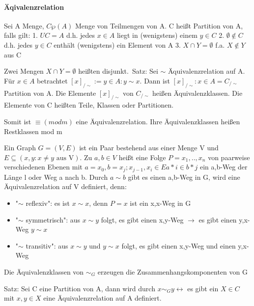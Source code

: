 \documentclass[10pt,landscape]{article}
\begin{document}
\begin{multicols}{3}
\paragraph{Äqivalenzrelation}
Sei A Menge, $C\wp (A)$ Menge von Teilmengen von A. C heißt Partition von A, falls gilt:
1. $UC=A$ d.h. jedes $x\in A$ liegt in (wenigstens) einem $y\in C$
2. $\emptyset \not \in C$ d.h. jedes $y\in C$ enthält (wenigstens) ein Element von A
3. $X \cap Y = \emptyset$ f.a. $X\not \in Y$ aus C

Zwei Mengen $X\cap Y = \emptyset$ heißten disjunkt.\
Satz: Sei $\sim$ Äquivalenzrelation auf A. Für $x\in A$ betrachtet $[x]_{/ \sim }:={y\in A: y \sim x}$. Dann ist ${[x]_{/ \sim }:x\in A}= C_{/ \sim }$ Partition von A. Die Elemente $[x]_{/ \sim }$ von $C_{/ \sim }$ heißen Äquivalenzklassen. Die Elemente von C heißten Teile, Klassen oder Partitionen.

Somit ist $\equiv(mod m)$ eine Äquivalenzrelation. Ihre Äquivalenzklassen heißen Restklassen mod m

Ein Graph $G=(V,E)$ ist ein Paar bestehend aus einer Menge V und $E\subseteq (x,y: x \not = y \text{ aus V} )$.
Zu $a,b\in V$ heißt eine Folge $P=x_1,..,x_n$ von paarweise verschiedenen Ebenen mit $a=x_0, b=x_j; x_{j-1},x_i \in E{a*i \in b*j}$ ein a,b-Weg der Länge l oder Weg a nach b. Durch $a\sim b$ gibt es einen a,b-Weg in G, wird eine Äquivalenzrelation auf V definiert, denn:
\begin{itemize}
    \item "$\sim$ reflexiv": es ist $x\sim x$, denn $P=x$ ist ein x,x-Weg in G
    \item "$\sim$ symmetrisch": aus $x\sim y$ folgt, es gibt einen x,y-Weg $\rightarrow$ es gibt einen y,x-Weg $y\sim x$
    \item "$\sim$ transitiv": aus $x\sim y$ und $y\sim x$ folgt, es gibt einen x,y-Weg und einen y,x-Weg
\end{itemize}
Die Äquivalenzklassen von $\sim _G$ erzeugen die Zusammenhangskomponenten von G

Satz: Sei C eine Partition von A, dann wird durch $x\sim _G y \leftrightarrow$ es gibt ein $X\in C$ mit $x,y\in X$ eine Äquivalenzrelation auf A definiert.


\end{multicols}
\end{document}
